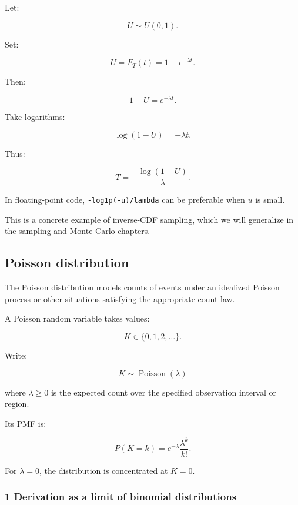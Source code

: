 \hypertarget{02-foundations-ii-ch024-inverse-transform-sampling}{}

Let:

\[
 U\sim U(0,1).
\]

Set:

\[
 U=F_T(t)=1-e^{-\lambda t}.
\]

Then:

\[
 1-U=e^{-\lambda t}.
\]

Take logarithms:

\[
 \log(1-U)=-\lambda t.
\]

Thus:

\[
 \boxed{ T=-\frac{\log(1-U)}{\lambda} }.
\]

In floating-point code, \texttt{-log1p(-u)/lambda} can be preferable when \(u\) is small.

This is a concrete example of inverse-CDF sampling, which we will generalize in the sampling and Monte Carlo chapters.

\subsection{Poisson distribution}\label{02-foundations-ii-ch024-poisson-distribution}

\hypertarget{02-foundations-ii-ch024-poisson-distribution}{}

The Poisson distribution models counts of events under an idealized Poisson process or other situations satisfying the appropriate count law.

A Poisson random variable takes values:

\[
 K\in\{0,1,2,\ldots\}.
\]

Write:

\[
 \boxed{K\sim\operatorname{Poisson}(\lambda)}
\]

where \(\lambda\ge0\) is the expected count over the specified observation interval or region.

Its PMF is:

\[
 \boxed{ P(K=k)= e^{-\lambda}\frac{\lambda^k}{k!} }.
\]

For \(\lambda=0\), the distribution is concentrated at \(K=0\).

\subsubsection{1 Derivation as a limit of binomial distributions}\label{02-foundations-ii-ch024-derivation-as-a-limit-of-binomial-distributions}


